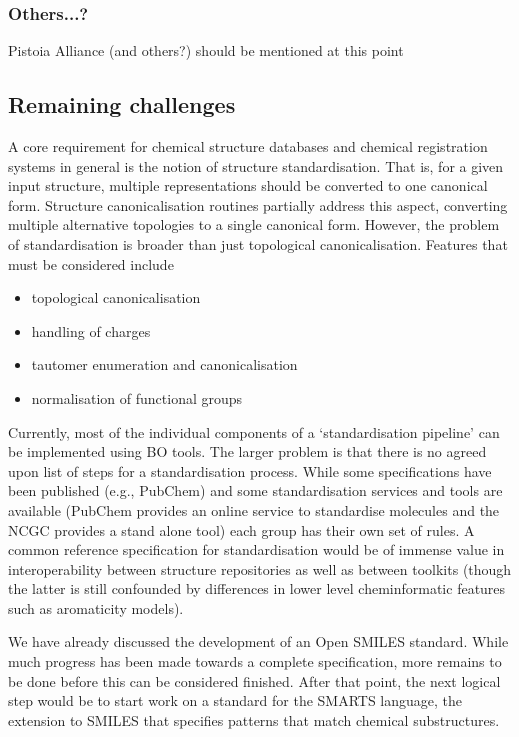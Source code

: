 \documentclass[10pt]{bmc_article}
\newenvironment{bmcformat}{\begin{raggedright}\baselineskip20pt\sloppy\setboolean{publ}{false}}{\end{raggedright}\baselineskip20pt\sloppy}
\begin{document}
\begin{bmcformat}
\subsubsection*{Others...?}

Pistoia Alliance (and others?) should be mentioned at this point

  \subsection*{Remaining challenges}

A core requirement for chemical structure databases and chemical
registration systems in general is the notion of structure
standardisation.  That is,  for a given input structure, multiple
representations should be converted to one canonical form.
Structure canonicalisation routines partially address this aspect,
converting multiple alternative topologies to a single canonical
form. However, the problem of standardisation is broader than just
topological canonicalisation. Features that must be considered include
\begin{itemize}
\item topological canonicalisation
\item handling of charges
\item tautomer enumeration and canonicalisation
\item normalisation of functional groups
\end{itemize}
Currently, most of the individual components of a `standardisation
pipeline' can be implemented using BO tools. The larger problem is
that there is no agreed upon list of steps for a standardisation
process. While some specifications have been published (e.g., PubChem)
and some standardisation services and tools are available (PubChem
provides an online service to standardise molecules and the NCGC
provides a stand alone tool) each group has their own set of rules. A
common reference specification for standardisation would be of immense
value in interoperability between structure repositories as well as
between toolkits (though the latter is still confounded by differences
in lower level cheminformatic features such as aromaticity models).

We have already discussed the development of an Open SMILES standard.
While much progress has been made towards a complete specification,
more remains to be done before this can be considered finished. After
that point, the next logical step would be to start work on a standard
for the SMARTS language, the extension to SMILES that specifies
patterns that match chemical substructures.


\end{bmcformat}
\end{document}
